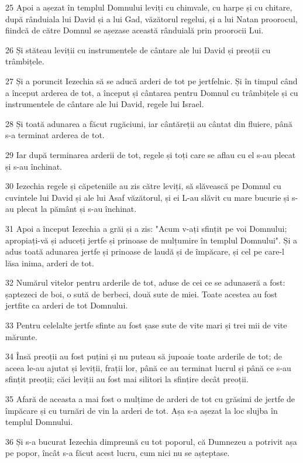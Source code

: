 \par 25 Apoi a așezat în templul Domnului leviți cu chimvale, cu harpe și cu chitare, după rânduiala lui David și a lui Gad, văzătorul regelui, și a lui Natan proorocul, fiindcă de către Domnul se așezase această rânduială prin proorocii Lui.
\par 26 Și stăteau leviții cu instrumentele de cântare ale lui David și preoții cu trâmbițele.
\par 27 Și a poruncit Iezechia să se aducă arderi de tot pe jertfelnic. Și în timpul când a început arderea de tot, a început și cântarea pentru Domnul cu trâmbițele și cu instrumentele de cântare ale lui David, regele lui Israel.
\par 28 Și toată adunarea a făcut rugăciuni, iar cântăreții au cântat din fluiere, până s-a terminat arderea de tot.
\par 29 Iar după terminarea arderii de tot, regele și toți care se aflau cu el s-au plecat și s-au închinat.
\par 30 Iezechia regele și căpeteniile au zis către leviți, să slăvească pe Domnul cu cuvintele lui David și ale lui Asaf văzătorul, și ei L-au slăvit cu mare bucurie și s-au plecat la pământ și s-au închinat.
\par 31 Apoi a început Iezechia a grăi și a zis: "Acum v-ați sfințit pe voi Domnului; apropiați-vă și aduceți jertfe și prinoase de mulțumire în templul Domnului". Și a adus toată adunarea jertfe și prinoase de laudă și de împăcare, și cel pe care-l lăsa inima, arderi de tot.
\par 32 Numărul vitelor pentru arderile de tot, aduse de cei ce se adunaseră a fost: șaptezeci de boi, o sută de berbeci, două sute de miei. Toate acestea au fost jertfite ca arderi de tot Domnului.
\par 33 Pentru celelalte jertfe sfinte au fost șase sute de vite mari și trei mii de vite mărunte.
\par 34 Însă preoții au fost puțini și nu puteau să jupoaie toate arderile de tot; de aceea le-au ajutat și leviții, frații lor, până ce au terminat lucrul și până ce s-au sfințit preoții; căci leviții au fost mai silitori la sfințire decât preoții.
\par 35 Afară de aceasta a mai fost o mulțime de arderi de tot cu grăsimi de jertfe de împăcare și cu turnări de vin la arderi de tot. Așa s-a așezat la loc slujba în templul Domnului.
\par 36 Și s-a bucurat Iezechia dimpreună cu tot poporul, că Dumnezeu a potrivit așa pe popor, încât s-a făcut acest lucru, cum nici nu se așteptase.

